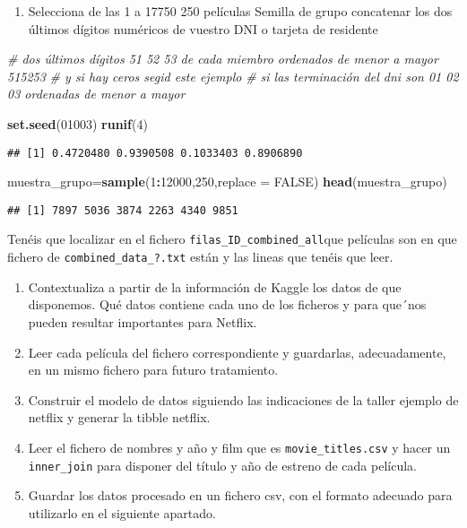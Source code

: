 \documentclass[
]{article}
\newenvironment{Shaded}{\begin{snugshade}}{\end{snugshade}}
\newcommand{\CommentTok}[1]{\textcolor[rgb]{0.56,0.35,0.01}{\textit{#1}}}
\newcommand{\DataTypeTok}[1]{\textcolor[rgb]{0.13,0.29,0.53}{#1}}
\newcommand{\DecValTok}[1]{\textcolor[rgb]{0.00,0.00,0.81}{#1}}
\newcommand{\KeywordTok}[1]{\textcolor[rgb]{0.13,0.29,0.53}{\textbf{#1}}}
\newcommand{\NormalTok}[1]{#1}
\newcommand{\OperatorTok}[1]{\textcolor[rgb]{0.81,0.36,0.00}{\textbf{#1}}}
\newcommand{\OtherTok}[1]{\textcolor[rgb]{0.56,0.35,0.01}{#1}}
\providecommand{\tightlist}{%
  \setlength{\itemsep}{0pt}\setlength{\parskip}{0pt}}
\begin{document}
\begin{enumerate}
\def\labelenumi{\arabic{enumi}.}
\tightlist
\item
  Selecciona de las 1 a 17750 250 películas Semilla de grupo concatenar
  los dos últimos dígitos numéricos de vuestro DNI o tarjeta de
  residente
\end{enumerate}

\begin{Shaded}
\begin{Highlighting}[]
\CommentTok{# dos últimos dígitos 51 52 53 de cada miembro ordenados de menor a mayor 515253}
\CommentTok{#  y si hay ceros  segid este ejemplo}
\CommentTok{#  si las terminación del dni son 01 02 03 ordenadas de menor a mayor}

\KeywordTok{set.seed}\NormalTok{(}\DecValTok{01003}\NormalTok{)}
\KeywordTok{runif}\NormalTok{(}\DecValTok{4}\NormalTok{)}
\end{Highlighting}
\end{Shaded}

\begin{verbatim}
## [1] 0.4720480 0.9390508 0.1033403 0.8906890
\end{verbatim}

\begin{Shaded}
\begin{Highlighting}[]
\NormalTok{muestra_grupo=}\KeywordTok{sample}\NormalTok{(}\DecValTok{1}\OperatorTok{:}\DecValTok{12000}\NormalTok{,}\DecValTok{250}\NormalTok{,}\DataTypeTok{replace =} \OtherTok{FALSE}\NormalTok{)}
\KeywordTok{head}\NormalTok{(muestra_grupo)}
\end{Highlighting}
\end{Shaded}

\begin{verbatim}
## [1] 7897 5036 3874 2263 4340 9851
\end{verbatim}

Tenéis que localizar en el fichero \texttt{filas\_ID\_combined\_all}que
películas son en que fichero de \texttt{combined\_data\_?.txt} están y
las lineas que tenéis que leer.

\begin{enumerate}
\def\labelenumi{\arabic{enumi}.}
\item
  Contextualiza a partir de la información de Kaggle los datos de que
  disponemos. Qué datos contiene cada uno de los ficheros y para que´nos
  pueden resultar importantes para Netflix.
\item
  Leer cada película del fichero correspondiente y guardarlas,
  adecuadamente, en un mismo fichero para futuro tratamiento.
\item
  Construir el modelo de datos siguiendo las indicaciones de la taller
  ejemplo de netflix y generar la tibble netflix.
\item
  Leer el fichero de nombres y año y film que es
  \texttt{movie\_titles.csv} y hacer un \texttt{inner\_join} para
  disponer del título y año de estreno de cada película.
\item
  Guardar los datos procesado en un fichero csv, con el formato adecuado
  para utilizarlo en el siguiente apartado.
\end{enumerate}
\end{document}
